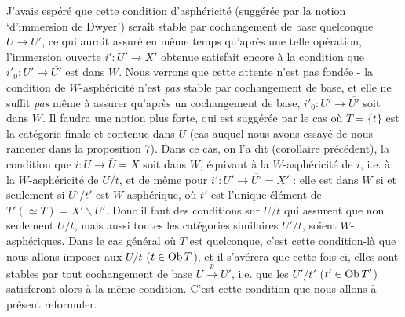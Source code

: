 J’avais espéré que cette condition d’asphéricité (suggérée par la notion ‘d’immersion de Dwyer’) serait stable par cochangement de base quelconque $U\longrightarrow U'$, ce qui aurait assuré en même temps qu’après une telle opération, l’immersion ouverte $i':U'\longrightarrow X'$ obtenue satisfait encore à la condition que $i'_0:U'\longrightarrow\overline{U'}$ est dans $W$. Nous verrons que cette attente n’est pas fondée - la condition de $W$-asphéricité n’est \textit{pas} stable par cochangement de base, et elle ne suffit \textit{pas} même à assurer qu’après un cochangement de base, $i'_0:U'\longrightarrow\overline{U'}$ soit
dans $W$. Il faudra une notion plus forte, qui est suggérée par le cas où $T=\{t\}$ est la catégorie finale et contenue dans $\bar U$ (cas auquel nous avons essayé de nous ramener dans la proposition 7). Dans ce cas, on l’a dit (corollaire précédent), la condition que $i:U\longrightarrow\bar U=X$ soit dans $W$, équivaut à la $W$-asphéricité de $i$, i.e. à la $W$-asphéricité de $U/t$, et de même pour $i':U'\longrightarrow\overline{U'}=X'$ : elle est dans $W$ si et seulement si $U'/t'$ est $W$-asphérique, où
$t'$ est l’unique élément de $T'(\simeq T)=X'\backslash U'$. Donc il faut des conditions sur $U/t$ qui assurent que non seulement $U/t$, mais aussi toutes les catégories similaires $U'/t$, soient $W$-asphériques. Dans le cas général où $T$ est quelconque, c’est cette condition-là que nous allons imposer aux $U/t$ ($t\in\mathrm{Ob}\, T$), et il s’avérera que cette fois-ci, elles sont stables par tout cochangement de base $U\xrightarrow{p}U'$, i.e. que les $U'/t'$ ($t'\in\mathrm{Ob}\, T'$) satisferont alors à la même condition. C’est cette condition que nous allons à présent reformuler.


